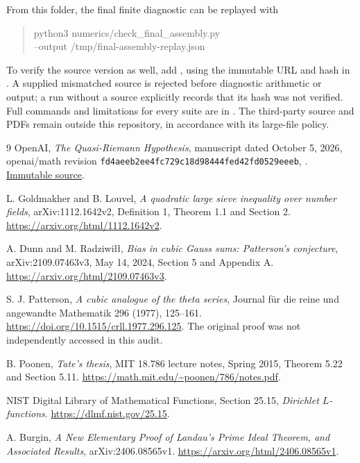 \documentclass[11pt]{article}
\numberwithin{equation}{section}
\theoremstyle{definition}
\theoremstyle{remark}
\begin{document}
From this folder, the final finite diagnostic can be replayed with
\begin{quote}\small\ttfamily
python3 numerics/check\_final\_assembly.py\\
\hspace*{1em}--output /tmp/final-assembly-replay.json
\end{quote}
To verify the source version as well, add
, using the immutable URL and hash
in . A supplied
mismatched source is rejected before diagnostic arithmetic or
output; a run without a source explicitly records that its hash
was not verified. Full commands and limitations for every suite
are in . The third-party source and PDFs
remain outside this repository, in accordance with its large-file
policy.

\begin{thebibliography}{9}
OpenAI, \emph{The Quasi-Riemann Hypothesis}, manuscript dated
October 5, 2026, openai/math revision
\texttt{fd4aeeb2ee4fc729c18d98444fed42fd0529eeeb},
.
\href{https://github.com/openai/math/blob/fd4aeeb2ee4fc729c18d98444fed42fd0529eeeb/preprints/The-Quasi-Riemann-Hypothesis-October-5-2026/build/paper2.tex}{Immutable source}.

L. Goldmakher and B. Louvel,
\emph{A quadratic large sieve inequality over number fields},
arXiv:1112.1642v2, Definition 1, Theorem 1.1 and Section 2.
\url{https://arxiv.org/html/1112.1642v2}.

A. Dunn and M. Radziwi{\l}{\l},
\emph{Bias in cubic Gauss sums: Patterson's conjecture},
arXiv:2109.07463v3, May 14, 2024, Section 5 and Appendix A.
\url{https://arxiv.org/html/2109.07463v3}.

S. J. Patterson, \emph{A cubic analogue of the theta series},
Journal f\"ur die reine und angewandte Mathematik 296 (1977),
125--161. \url{https://doi.org/10.1515/crll.1977.296.125}.
The original proof was not independently accessed in this audit.

B. Poonen, \emph{Tate's thesis}, MIT 18.786 lecture notes,
Spring 2015, Theorem 5.22 and Section 5.11.
\url{https://math.mit.edu/~poonen/786/notes.pdf}.

NIST Digital Library of Mathematical Functions,
Section 25.15, \emph{Dirichlet \(L\)-functions}.
\url{https://dlmf.nist.gov/25.15}.

A. Burgin, \emph{A New Elementary Proof of Landau's Prime Ideal
Theorem, and Associated Results}, arXiv:2406.08565v1.
\url{https://arxiv.org/html/2406.08565v1}.
\end{thebibliography}
\end{document}
